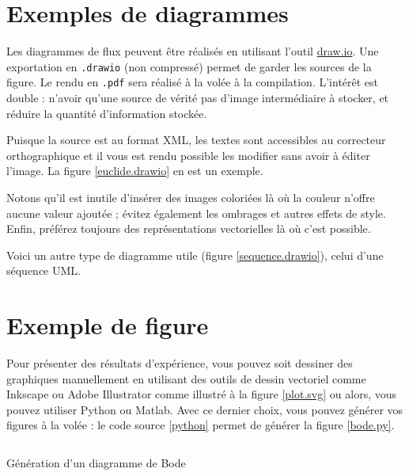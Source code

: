 \section{Exemples de diagrammes}

Les diagrammes de flux peuvent être réalisés en utilisant l'outil \href{https://app.diagrams.net/}{draw.io}. Une exportation en \texttt{.drawio} (non compressé) permet de garder les sources de la figure. Le rendu en \texttt{.pdf} sera réalisé à la volée à la compilation. L'intérêt est double : n'avoir qu'une source de vérité \cad pas d'image intermédiaire à stocker, et réduire la quantité d'information stockée.

Puisque la source est au format XML, les textes sont accessibles au correcteur orthographique et il vous est rendu possible les modifier sans avoir à éditer l'image. La figure \ref{euclide.drawio} en est un exemple.


Notons qu'il est inutile d'insérer des images coloriées là où la couleur n'offre aucune valeur ajoutée ; évitez également les ombrages et autres effets de style. Enfin, préférez toujours des représentations vectorielles là où c'est possible.

Voici un autre type de diagramme utile (figure \ref{sequence.drawio}), celui d'une séquence UML.


\section{Exemple de figure}

Pour présenter des résultats d'expérience, vous pouvez soit dessiner des graphiques manuellement en utilisant des outils de dessin vectoriel comme Inkscape ou Adobe Illustrator comme illustré à la figure \ref{plot.svg} ou alors, vous pouvez utiliser Python ou Matlab. Avec ce dernier choix, vous pouvez générer vos figures à la volée : le code source \ref{python} permet de générer la figure \ref{bode.py}.


\begin{listing}[h]
    \inputminted{python}{assets/figures/bode.py}
    \caption{Génération d'un diagramme de Bode \label{python}}
\end{listing}



